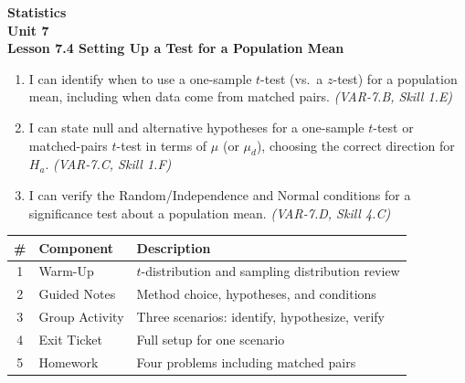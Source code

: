 \documentclass[10pt]{article}
\begin{document}
\vspace{-0.8in}

\begin{center}
  {\color{white}\textbf{\LARGE Statistics}}\\[4pt]
  {\color{skymid}\large\textbf{Unit 7}}\\[6pt]
  {\color{white}\textbf{\large Lesson 7.4 \quad Setting Up a Test for a Population Mean}}
\end{center}

\vspace{0.22in}
\namedateperiod
\vspace{0.18in}

\begin{learningtargetbox}
\small
\begin{enumerate}[leftmargin=1.5em, itemsep=5pt]
  \item I can identify when to use a one-sample $t$-test (vs.\ a $z$-test) for a population
        mean, including when data come from matched pairs.
        \textit{(VAR-7.B, Skill 1.E)}
  \item I can state null and alternative hypotheses for a one-sample $t$-test or matched-pairs
        $t$-test in terms of $\mu$ (or $\mu_d$), choosing the correct direction for $H_a$.
        \textit{(VAR-7.C, Skill 1.F)}
  \item I can verify the Random/Independence and Normal conditions for a significance test
        about a population mean. \textit{(VAR-7.D, Skill 4.C)}
\end{enumerate}
\end{learningtargetbox}

\vspace{0.14in}

\begin{tocbox}
\small
\renewcommand{\arraystretch}{1.5}
\begin{tabularx}{\linewidth}{@{} c l X @{}}
\rowcolor{sky}
\textbf{\#} & \textbf{Component} & \textbf{Description} \\
\midrule
1 & Warm-Up        & $t$-distribution and sampling distribution review \\
2 & Guided Notes   & Method choice, hypotheses, and conditions \\
3 & Group Activity & Three scenarios: identify, hypothesize, verify \\
4 & Exit Ticket    & Full setup for one scenario \\
5 & Homework       & Four problems including matched pairs \\
\end{tabularx}
\end{tocbox}
\end{document}
